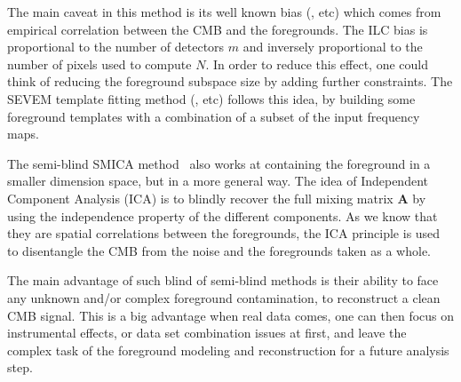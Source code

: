 \begin{itemize}
The main caveat in this method is its well known bias (\cite{hinshaw07, delabrouille09}, etc) which comes from empirical correlation between the CMB and the foregrounds. The ILC bias is proportional to the number of detectors $m$ and inversely proportional to the number of pixels used to compute $N$. In order to reduce this effect, one could think of reducing the foreground subspace size by adding further constraints. The SEVEM template fitting method (\cite{martinezgonzalez03}, etc) follows this idea, by building some foreground templates with a combination of a subset of the input frequency maps.

The semi-blind SMICA method~\cite{cardoso08} also works at containing the foreground in a smaller dimension space, but in a more general way. The idea of Independent Component Analysis (ICA) is to blindly recover the full mixing matrix $\mathbf{A}$ by using the independence property of the different components. As we know that they are spatial correlations between the foregrounds, the ICA principle is used to disentangle the CMB from the noise and the foregrounds taken as a whole.

The main advantage of such blind of semi-blind methods is their ability to face any unknown and/or complex foreground contamination, to reconstruct a clean CMB signal. This is a big advantage when real data comes, one can then focus on instrumental effects, or data set combination issues at first, and leave the complex task of the foreground modeling and reconstruction for a future analysis step.


\end{itemize}

